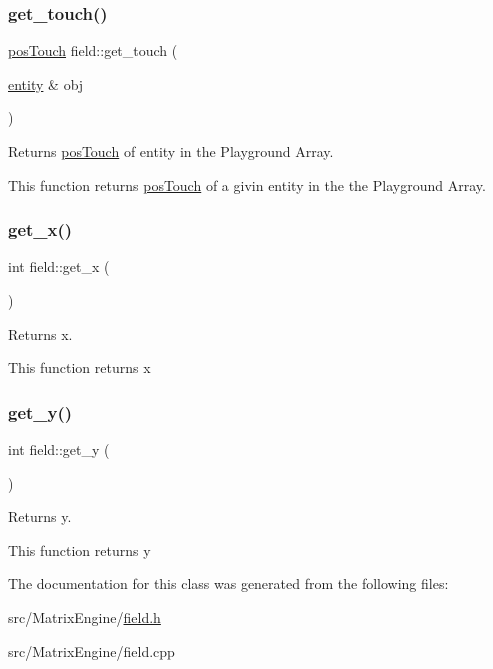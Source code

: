 \subsubsection{\texorpdfstring{get\+\_\+touch()}{get\_touch()}}
{\footnotesize\ttfamily \hyperlink{classposTouch}{pos\+Touch} field\+::get\+\_\+touch (\begin{DoxyParamCaption}\item[{\hyperlink{classentity}{entity} \&}]{obj }\end{DoxyParamCaption})}



Returns \hyperlink{classposTouch}{pos\+Touch} of entity in the Playground Array. 

This function returns \hyperlink{classposTouch}{pos\+Touch} of a givin entity in the the Playground Array. \mbox{\label{classfield_a87f95797eadbc2b60276d4503383bef0}} 
\subsubsection{\texorpdfstring{get\+\_\+x()}{get\_x()}}
{\footnotesize\ttfamily int field\+::get\+\_\+x (\begin{DoxyParamCaption}{ }\end{DoxyParamCaption})\hspace{0.3cm}{\ttfamily [inline]}}



Returns x. 

This function returns x \mbox{\label{classfield_aa5aad6f7a49d4265ec8c482030553a18}} 
\subsubsection{\texorpdfstring{get\+\_\+y()}{get\_y()}}
{\footnotesize\ttfamily int field\+::get\+\_\+y (\begin{DoxyParamCaption}{ }\end{DoxyParamCaption})\hspace{0.3cm}{\ttfamily [inline]}}



Returns y. 

This function returns y 

The documentation for this class was generated from the following files\+:\begin{DoxyCompactItemize}
\item 
src/\+Matrix\+Engine/\hyperlink{field_8h}{field.\+h}\item 
src/\+Matrix\+Engine/field.\+cpp\end{DoxyCompactItemize}
